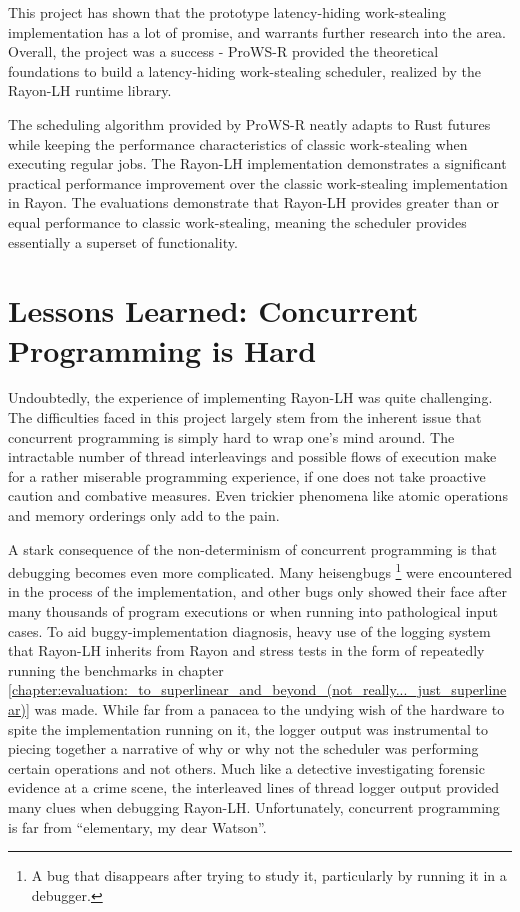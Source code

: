 \documentclass[bsc,frontabs,singlespacing,parskip,deptreport,normalheadings]{infthesis}
\begin{document}
This project has shown that the prototype latency-hiding work-stealing
implementation has a lot of promise, and warrants further research into the
area. Overall, the project was a success - ProWS-R provided the theoretical
foundations to build a latency-hiding work-stealing scheduler, realized by the
Rayon-LH runtime library.

The scheduling algorithm provided by ProWS-R neatly adapts to Rust futures while
keeping the performance characteristics of classic work-stealing when executing
regular jobs. The Rayon-LH implementation demonstrates a significant practical
performance improvement over the classic work-stealing implementation in Rayon.
The evaluations demonstrate that Rayon-LH provides greater than or equal
performance to classic work-stealing, meaning the scheduler provides essentially
a superset of functionality.

\section{Lessons Learned: Concurrent Programming is Hard}

Undoubtedly, the experience of implementing Rayon-LH was quite challenging.
The difficulties faced in this project largely stem from the inherent issue that
concurrent programming is simply hard to wrap one's mind around. The intractable
number of thread interleavings and possible flows of execution make for a rather
miserable programming experience, if one does not take proactive caution and
combative measures. Even trickier phenomena like atomic operations and memory
orderings only add to the pain.

A stark consequence of the non-determinism of concurrent programming is that
debugging becomes even more complicated. Many heisengbugs \footnote{A bug that
disappears after trying to study it, particularly by running it in a debugger.}
were encountered in the process of the implementation, and other bugs only
showed their face after many thousands of program executions or when running
into pathological input cases. To aid buggy-implementation diagnosis, heavy use
of the logging system that Rayon-LH inherits from Rayon and stress tests in the
form of repeatedly running the benchmarks in chapter
\ref{chapter:evaluation:_to_superlinear_and_beyond_(not_really..._just_superlinear)}
was made. While far from a panacea to the undying wish of the hardware to spite
the implementation running on it, the logger output was instrumental to piecing
together a narrative of why or why not the scheduler was performing certain
operations and not others. Much like a detective investigating forensic evidence
at a crime scene, the interleaved lines of thread logger output provided many
clues when debugging Rayon-LH. Unfortunately, concurrent programming is far from
``elementary, my dear Watson''.
\end{document}
